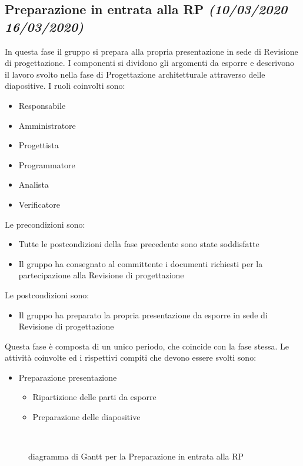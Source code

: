 \documentclass[../piano-di-progetto.tex]{subfiles}
\begin{document}
\subsection[Preparazione in entrata alla RP]{Preparazione in entrata alla RP {\normalsize\normalfont\itshape(10/03/2020  16/03/2020)}}%
\label{sub:preparazione_in_entrata_alla_rp}
In questa fase il gruppo si prepara alla propria presentazione in sede di Revisione di progettazione.
I componenti si dividono gli argomenti da esporre e descrivono il lavoro svolto nella fase di Progettazione architetturale attraverso delle diapositive.
I ruoli coinvolti sono:
\begin{itemize}
  \item Responsabile
  \item Amministratore
  \item Progettista
  \item Programmatore
  \item Analista
  \item Verificatore
\end{itemize}
Le precondizioni sono:
\begin{itemize}
  \item Tutte le postcondizioni della fase precedente sono state soddisfatte
  \item Il gruppo ha consegnato al committente i documenti richiesti per la partecipazione alla Revisione di progettazione
\end{itemize}
Le postcondizioni sono:
\begin{itemize}
  \item Il gruppo ha preparato la propria presentazione da esporre in sede di Revisione di progettazione
\end{itemize}
Questa fase è composta di un unico periodo, che coincide con la fase stessa.
Le attività coinvolte ed i rispettivi compiti che devono essere svolti sono:
\begin{itemize}
  \item Preparazione presentazione
  \begin{itemize}
    \item Ripartizione delle parti da esporre
    \item Preparazione delle diapositive
  \end{itemize}
\end{itemize}
\begin{figure}[H]
  \centering
  
  \caption{diagramma di Gantt per la Preparazione in entrata alla RP}%
~~\label{fig:gantt_preparazione_rp}
\end{figure}
\end{document}
